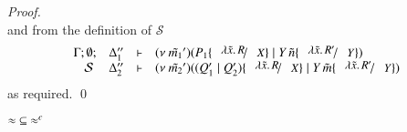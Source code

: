 \begin{proof}
\[\]
	\noi and from the definition of $\mathcal{S}$
%
	\[
		\mhorel{\Gamma}{\Delta_1''}{\newsp{\tilde{m_1}'}{P_1 \subst{\abs{\tilde{x}}{R}}{X} \Par \appl{Y}{\tilde{n}} \subst{\abs{\tilde{x}}{R'}}{Y}}}
		{\ \mathcal{S}\ }
		{\Delta_2''}{}{\newsp{\tilde{m_2}'}{(Q_1' \Par Q_2') \subst{\abs{\tilde{x}}{R}}{X} \Par \appl{Y}{\tilde{m}} \subst{\abs{\tilde{x}}{R'}}{Y}}}
	\]
	\noi as required.
	\qed
\end{proof}


\begin{lemma}\rm
	\label{lem:wb_is_wbc}
	$\approx\ \subseteq\ \approx^{c}$
\end{lemma}

